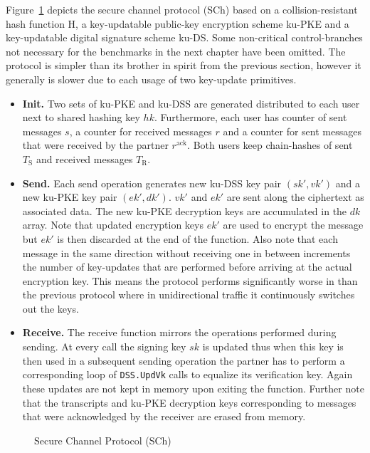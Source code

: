\documentclass[11pt,a4paper,twoside,openright,bibliography=totoc]{scrbook}
\renewcommand{\t}{\text} %
\begin{document}
Figure~\ref{fig:secure-channel} depicts the secure channel
protocol (SCh) based on a collision-resistant
hash function H, a key-updatable public-key encryption scheme ku-PKE and
a key-updatable digital signature scheme ku-DS. Some non-critical
control-branches not necessary for the benchmarks in the next chapter
have been omitted. The protocol is simpler than
its brother in spirit from the previous section, however it
generally is slower due to each usage of two key-update primitives.
\begin{itemize}
\item \textbf{Init.} Two sets of ku-PKE and ku-DSS are generated
  distributed to each user next to shared hashing key $hk$. Furthermore,
  each user has counter of sent messages $s$, a counter for received messages
  $r$ and a counter for sent messages that were received by the partner
  $r^\t{ack}$. Both users keep chain-hashes of sent $T_\t{S}$ and received
  messages $T_\t{R}$.
\item \textbf{Send.} Each send operation generates new ku-DSS key pair
  $(sk',vk')$ and a new ku-PKE key pair $(ek',dk')$. $vk'$ and $ek'$ are sent
  along the ciphertext as associated data. The new ku-PKE decryption keys
  are accumulated in the $dk$ array. Note that updated encryption keys $ek'$
  are used to encrypt the message but $ek'$ is then discarded at the end of
  the function. Also note that each message in the same direction
  without receiving one in between increments the number of key-updates
  that are performed before arriving at the actual encryption key. This
  means the protocol performs significantly worse in than the previous
  protocol where in unidirectional traffic it continuously switches
  out the keys.
\item \textbf{Receive.} The receive function mirrors the operations
  performed during sending. At every call the signing key $sk$ is updated
  thus when this key is then used in a subsequent sending operation the
  partner has to perform a corresponding loop of \texttt{DSS.UpdVk}
  calls to equalize its verification key. Again these updates
  are not kept in memory upon exiting the function. Further note
  that the transcripts and ku-PKE decryption keys corresponding to messages
  that were acknowledged by the receiver are erased from memory.
\end{itemize}

\begin{figure}[p]
  \centering
  \setlength{\fboxsep}{10pt}
  \scalebox{0.9}{%
    \fbox{%
      
    }
  }
  \caption{Secure Channel Protocol (SCh)}
  \label{fig:secure-channel}
\end{figure}
\end{document}
